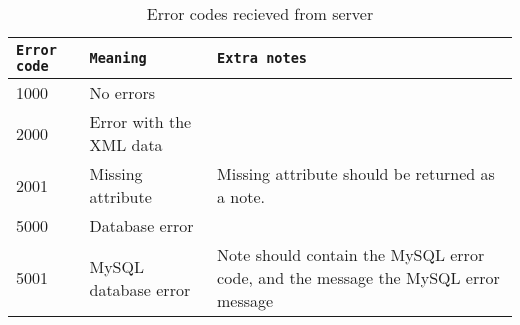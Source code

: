 \documentclass[titlepage, a4paper,10pt]{article}
\begin{document}
\begin{table}[h]
    \caption{Error codes recieved from server}
    \begin{tabular}{|l|l|p{5cm}|}
        \hline
        \texttt{Error code} & \texttt{Meaning} & \texttt{Extra notes} \\
        \hline
        \hline
        1000 & No errors & \\
        \hline
        \hline
        2000 & Error with the XML data & \\
        \hline
        2001 & Missing attribute & Missing attribute should be returned as a note. \\
        \hline
        \hline
        5000 & Database error & \\
        \hline
        5001 & MySQL database error & Note should contain the MySQL error code, and the message the MySQL error message \\
        \hline
    \end{tabular}
    \label{tbl:server_error_codes}
\end{table}
\end{document}
